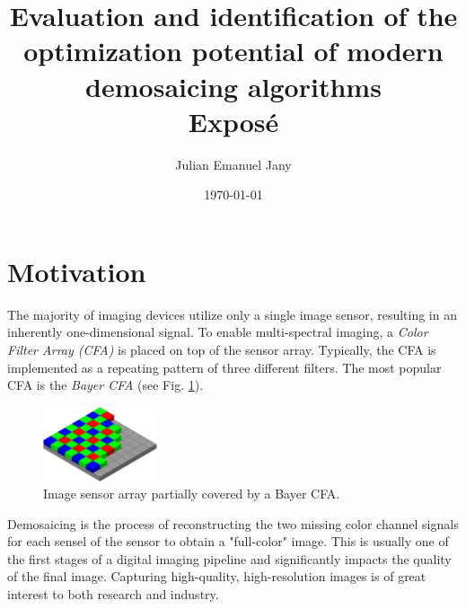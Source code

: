 \documentclass[english,notitlepage,smartquotes]{hgbreport}
\author{Julian Emanuel Jany}                     %
\title{Evaluation and identification of the optimization potential of modern demosaicing algorithms \\ %
			 \textbf{Exposé}}
\date{\today}
\begin{document}
\maketitle



\section{Motivation}

The majority of imaging devices utilize only a single image sensor, resulting in an inherently one-dimensional signal. 
To enable multi-spectral imaging, a \emph{Color Filter Array (CFA)} is placed on top of the sensor array. 
Typically, the CFA is implemented as a repeating pattern of three different filters. 
The most popular CFA is the \emph{Bayer CFA} (see Fig. \ref{fig:bayer_cfa}).

\begin{figure}[]
	\centering
	\includegraphics[width=0.3\textwidth]{bayer_pattern}
\caption{Image sensor array partially covered by a Bayer CFA. \cite{BayerCFA}}
\label{fig:bayer_cfa}
\end{figure}

Demosaicing is the process of reconstructing the two missing color channel signals for each sensel of the sensor to obtain a "full-color" image. 
This is usually one of the first stages of a digital imaging pipeline and significantly impacts the quality of the final image. 
Capturing high-quality, high-resolution images is of great interest to both research and industry. %
\end{document}
